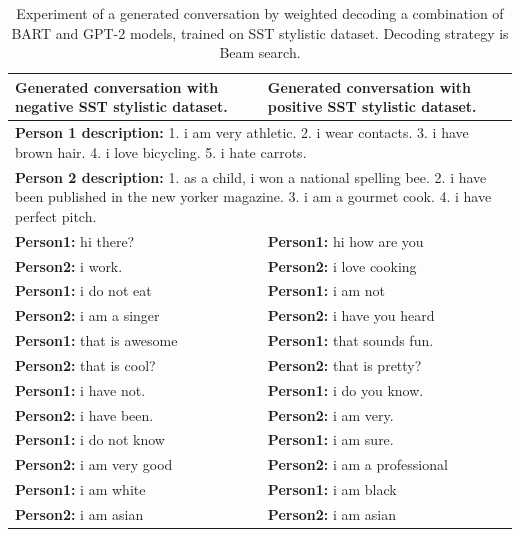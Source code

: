 \begin{table}[H]
\centering
 \begin{tabular}{|p{7cm}|p{7cm}|} 
 \hline
 \textbf{Generated conversation with negative SST stylistic dataset.} & \textbf{Generated conversation with positive SST stylistic dataset.}\\
 \hline
 \multicolumn{2}{|p{14cm}|}{\textbf{Person 1 description:} 1. i am very athletic. 2. i wear contacts. 3. i have brown hair. 4. i love bicycling. 5. i hate carrots.} \\
 \hline
 \multicolumn{2}{|p{14cm}|}{\textbf{Person 2 description:} 1. as a child, i won a national spelling bee. 2. i have been published in the new yorker magazine. 3. i am a gourmet cook. 4. i have perfect pitch.} \\
 \hline
 \textbf{Person1:} hi there? & \textbf{Person1:} hi how are you \\
 \textbf{Person2:} i work. &  \textbf{Person2:} i love cooking \\ 
 \textbf{Person1:} i do not eat & \textbf{Person1:} i am not \\
 \textbf{Person2:} i am a singer & \textbf{Person2:} i have you heard \\
 \textbf{Person1:} that is awesome & \textbf{Person1:} that sounds fun. \\
 \textbf{Person2:} that is cool? & \textbf{Person2:} that is pretty?  \\
 \textbf{Person1:} i have not. & \textbf{Person1:} i do you know. \\
 \textbf{Person2:} i have been. & \textbf{Person2:} i am very. \\
 \textbf{Person1:} i do not know & \textbf{Person1:} i am sure. \\
 \textbf{Person2:} i am very good & \textbf{Person2:} i am a professional \\
 \textbf{Person1:} i am white & \textbf{Person1:} i am black \\
 \textbf{Person2:} i am asian & \textbf{Person2:} i am asian \\
 \hline
 \end{tabular}
 \caption{Experiment of a generated conversation by weighted decoding a combination of BART and GPT-2 models, trained on SST stylistic dataset. Decoding strategy is Beam search.}
\label{tab:sst_wd}
\end{table}

